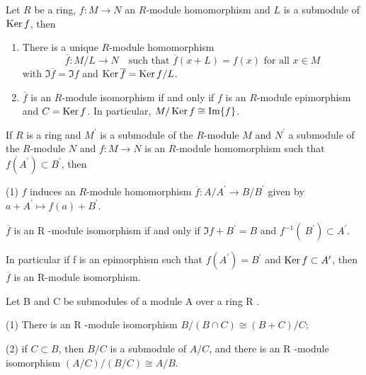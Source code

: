 \begin{theorem}
    Let $R$ be a ring, $f: M \rightarrow N$ an $R$-module homomorphism and $L$ is a submodule of $\operatorname{\operatorname{Ker}} f$, then
    \begin{enumerate}
        \item
              There is a unique $R$-module homomorphism
              \begin{equation*}
                  \overline{{f}}: M / L \rightarrow N \quad  \text{such that }\overline{{f}}(x + L)= f(x) \text{ for all } x \in M
              \end{equation*}
              with $\Im \overline{{f}}=\Im {f}$ and $\operatorname{\operatorname{Ker}} \overline{{f}}=\operatorname{\operatorname{Ker}} {f} / L$.
        \item  $ \overline{{f}}$ is an $R$-module isomorphism if and only if $f$ is an $R$-module epimorphism and ${C}=\operatorname{\operatorname{Ker}} f$.
              In particular, $M / \operatorname{\operatorname{Ker}} {f} \cong \Im {f}$.
    \end{enumerate}
\end{theorem}


\begin{corollary}
    If $R$ is a ring and $M^{\prime}$ is a submodule of the $R$-module $M$ and $N^{\prime}$ a submodule of the $R$-module $N$ and ${f}: M \rightarrow {N}$ is an $R$-module homomorphism such that ${f}\left(A^{\prime}\right) \subset B^{\prime}$, then

    (1) $f$ induces an $R$-module homomorphism $\overline{{f}}: A / A^{\prime} \rightarrow B / B^{\prime}$ given by ${a}+A^{\prime} \mapsto {f}({a})+{B}^{\prime} $.

    $ \overline{{f}}$ is an R -module isomorphism if and only if $\Im {f}+{B}^{\prime}={B}$ and ${f}^{-1}\left({~B}^{\prime}\right) \subset A^{\prime}$.

    In particular if f is an epimorphism such that ${f}\left(A^{\prime}\right)={B}^{\prime}$ and $\operatorname{\operatorname{Ker}} {f} \subset A^{\prime}$, then $\overline{{f}}$ is an R-module isomorphism.
\end{corollary}











\begin{theorem}
    Let B and C be submodules of a module A over a ring R .

    (1) There is an R -module isomorphism ${B} /({B} \cap C) \cong({B}+{C}) / C$;

    (2) if ${C} \subset B$, then ${B} / C$ is a submodule of $A / C$, and there is an R -module isomorphism $(A / C) /({B} / C) \cong A / B$.
\end{theorem}



